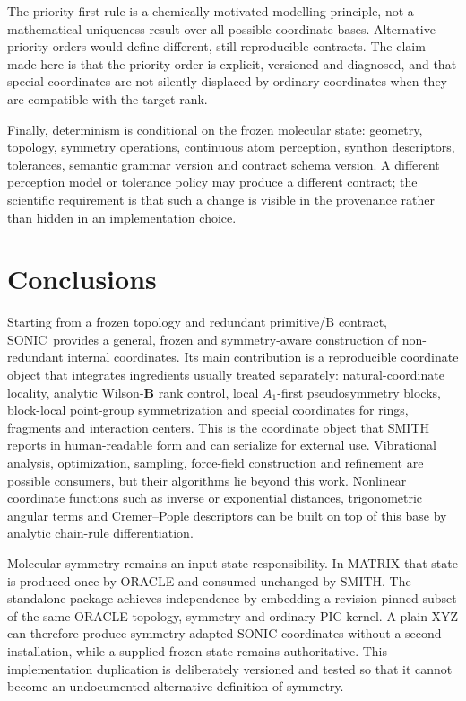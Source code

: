 \documentclass[journal=jctcce,manuscript=article,layout=traditional]{achemso}
\newcommand{\SONIC}{SONIC}
\newcommand{\Bmat}{\mathbf{B}}
\theoremstyle{definition}
\begin{document}
The priority-first rule is a chemically motivated modelling principle, not a
mathematical uniqueness result over all possible coordinate bases.  Alternative
priority orders would define different, still reproducible contracts.  The
claim made here is that the priority order is explicit, versioned and
diagnosed, and that special coordinates are not silently displaced by
ordinary coordinates when they are compatible with the target rank.

Finally, determinism is conditional on the frozen molecular state:
geometry, topology, symmetry operations, continuous atom perception, synthon
descriptors, tolerances, semantic grammar version and contract schema version.
A different perception model or tolerance policy may produce a different
contract; the scientific requirement is that such a change is visible in the
provenance rather than hidden in an implementation choice.

\section{Conclusions}

Starting from a frozen topology and redundant primitive/B contract, \SONIC\ provides a general, frozen and symmetry-aware construction of
non-redundant internal coordinates.  Its main contribution is a
reproducible coordinate object that integrates ingredients usually treated
separately: natural-coordinate locality, analytic Wilson-\(\Bmat\) rank control,
local \(A_1\)-first pseudosymmetry blocks, block-local point-group
symmetrization and special coordinates for
rings, fragments and interaction centers.  This is the coordinate object
that SMITH reports in human-readable form and can serialize for external use.
Vibrational analysis, optimization, sampling, force-field construction and
refinement are possible consumers, but their algorithms lie beyond this work.
Nonlinear coordinate functions such as inverse or exponential distances,
trigonometric angular terms and Cremer--Pople descriptors can be built on top of
this base by analytic chain-rule differentiation.

Molecular symmetry remains an input-state responsibility.  In MATRIX that
state is produced once by ORACLE and consumed unchanged by SMITH.  The
standalone package achieves independence by embedding a revision-pinned subset
of the same ORACLE topology, symmetry and ordinary-PIC kernel.  A plain XYZ can
therefore produce symmetry-adapted SONIC coordinates without a second
installation, while a supplied frozen state remains authoritative.  This
implementation duplication is deliberately versioned and tested so that it
cannot become an undocumented alternative definition of symmetry.
\end{document}
